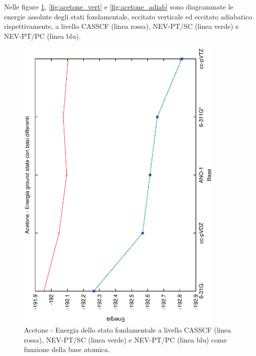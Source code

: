Nelle figure \ref{fig:acetone_gs}, \ref{fig:acetone_vert} e
\ref{fig:acetone_adiab} sono diagrammate le energie assolute degli stati
fondamentale, eccitato verticale ed eccitato adiabatico rispettivamente,
a livello CASSCF (linea rossa), NEV-PT/SC (linea verde) e NEV-PT/PC
(linea blu).
\begin{figure}[ht]
\begin{center}
\includegraphics[angle=270,width=10cm,keepaspectratio]{immagini/acetone/gs.eps}
\parbox[h]{12cm}{
\caption{\small Acetone - Energia dello stato fondamentale a livello CASSCF (linea rossa),
NEV-PT/SC (linea verde) e NEV-PT/PC (linea blu) come funzione della base
atomica.}
\label{fig:acetone_gs}
}
\end{center}
\end{figure}
